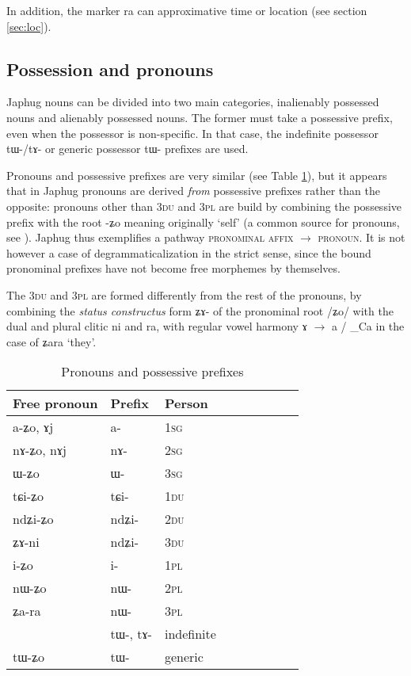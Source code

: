 \documentclass[oldfontcommands,oneside,a4paper,11pt]{article}
\newcommand{\ipa}[1]{{\phon #1}} %
\begin{document}
In addition, the marker \ipa{ra} can approximative time or location  (see section  \ref{sec:loc}).
 


 \subsection{Possession and pronouns} 
 
Japhug  nouns can be divided into two main categories, inalienably possessed nouns and alienably possessed nouns. The former must take a possessive prefix, even when the possessor is non-specific. In that case, the indefinite possessor \ipa{tɯ-/tɤ-} or generic possessor \ipa{tɯ-} prefixes are used.

Pronouns  and possessive prefixes are very similar (see Table \ref{tab:pronoun}), but it appears that in Japhug pronouns are derived \textit{from} possessive prefixes rather than the opposite: pronouns other than \textsc{3du} and \textsc{3pl} are build by combining the possessive prefix with the root \ipa{-ʑo} meaning originally `self' (a common source for pronouns, see \citealt{heine11pronoms}). Japhug thus exemplifies a pathway \textsc{pronominal affix} $\rightarrow$ \textsc{pronoun}. It is not however a case of degrammaticalization in the strict sense, since the bound pronominal prefixes have not become free morphemes by themselves.

The \textsc{3du} and \textsc{3pl} are formed differently from the rest of the pronouns, by combining the \textit{status constructus} form \ipa{ʑɤ-} of the pronominal root /\ipa{ʑo}/ with the dual and plural clitic \ipa{ni} and \ipa{ra}, with regular vowel harmony \ipa{ɤ} $\rightarrow$ \ipa{a} / \_Ca in the case of \ipa{ʑara} `they'.
 
 \begin{table}[H] \centering
\caption{Pronouns and possessive prefixes }\label{tab:pronoun}
\begin{tabular}{lllllllll} 
\toprule
 Free pronoun & Prefix & Person\\
\midrule
 \ipa{a-ʑo},    \ipa{ɤj} &	\ipa{a-}  &		1\textsc{sg} \\
\ipa{nɤ-ʑo},  \ipa{nɤj} &	\ipa{nɤ-}  &			2\textsc{sg}\\
\ipa{ɯ-ʑo}  &	\ipa{ɯ-}  &			3\textsc{sg}\\
\midrule
\ipa{tɕi-ʑo}  &	\ipa{tɕi-}  &			1\textsc{du} \\
\ipa{ndʑi-ʑo}  &	\ipa{ndʑi-}  &		2\textsc{du} \\	
\ipa{ʑɤ-ni}  &	\ipa{ndʑi-}  &		3\textsc{du} \\	
\midrule
\ipa{i-ʑo}    &	\ipa{i-}  &			1\textsc{pl} \\
\ipa{nɯ-ʑo}   &	\ipa{nɯ-}  &			2\textsc{pl} \\
\ipa{ʑa-ra}  &	\ipa{nɯ-}  &			3\textsc{pl} \\
\midrule
&  \ipa{tɯ-},  \ipa{tɤ-} & indefinite \\
\ipa{tɯ-ʑo} & \ipa{tɯ-}   &  generic\\
\bottomrule
\end{tabular}
\end{table}
 
\end{document}
